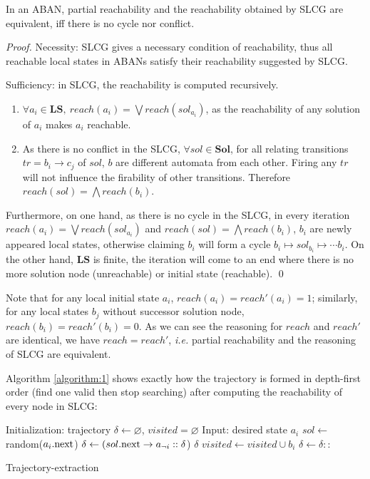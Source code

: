 \documentclass[runningheads]{llncs}
\newcommand{\acm}[3]{#1\rightarrow#2}
\begin{document}
\begin{theorem}
In an ABAN, partial reachability and the reachability obtained by SLCG are equivalent, iff there is no cycle nor conflict.
\end{theorem}
\begin{proof}
Necessity: SLCG gives a necessary condition of reachability, thus all reachable local states in ABANs satisfy their reachability suggested by SLCG.

Sufficiency: in SLCG, the reachability is computed recursively.
\begin{enumerate}
\item $\forall a_i\in \mathbf{LS},\ reach(a_i)=\bigvee reach(sol_{a_i})$, as the reachability of any solution
of $a_i$ makes $a_i$ reachable.\label{1}
\item As there is no conflict in the SLCG, $\forall sol\in \mathbf{Sol}$, for all relating transitions $tr=\acm{b_i}{c_j}{c_k}$ of $sol$, $b$ are different automata from each other. Firing any $tr$ will not influence the firability of other transitions. Therefore $reach(sol)=\bigwedge reach(b_i)$.
\end{enumerate}
Furthermore, on one hand, as there is no cycle in the SLCG, in every iteration $reach(a_i)=\bigvee reach(sol_{a_i})$ and $reach(sol)=\bigwedge reach(b_i)$, $b_i$ are newly appeared local states, otherwise claiming $b_i$ will form a cycle $b_i\mapsto sol_{b_i}\mapsto \cdots b_i$. On the other hand, $\mathbf{LS}$ is finite, the iteration will come to an end where there is no more solution node (unreachable) or initial state (reachable).	
\qed\end{proof} 

Note that for any local initial state $a_i$, $reach(a_i)=reach'(a_i)=1$; similarly, for any local states $b_j$ without successor solution node, $reach(b_i)=reach'(b_i)=0$. As we can see the reasoning for $reach$ and $reach'$ are identical, we have $reach=reach'$, \textit{i.e.} partial reachability and the reasoning of SLCG are equivalent.

Algorithm \ref{algorithm:1} shows exactly how the trajectory is formed in depth-first order (find one valid then stop searching) after computing the reachability of every node in SLCG:

\begin{algorithm}[ht]
\begin{algorithmic}
\State Initialization: trajectory $\delta\gets\varnothing$, $visited=\varnothing$
\State Input: desired state $a_i$
	\State $sol\gets $random($a_i{\rm .next}$)%
	\State $\delta \gets (\acm{sol{\rm .next}}{a_{\lnot i}}{a_i}::\delta$)
    	\State \Return $\delta$
    \EndIf
        	\State$visited\gets visited\cup b_i$
            \State $\delta\gets \delta::$
        \EndFor
    \EndIf
\EndFunction
\end{algorithmic}
\caption{Trajectory-extraction}
\label{algorithm:1}
\end{algorithm}
\end{document}
